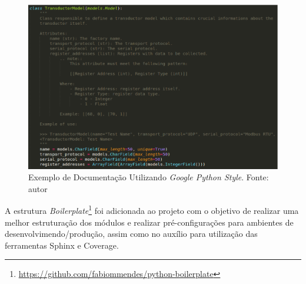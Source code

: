 \begin{figure}[!htpb]
    \centering
    \includegraphics[keepaspectratio=true,scale=0.5]{figuras/documentacao01.eps}
    \caption{Exemplo de Documentação Utilizando \textit{Google Python Style}. Fonte: autor}
    \label{documentacao01}
\end{figure}

A estrutura \textit{Boilerplate}\footnote{\url{https://github.com/fabiommendes/python-boilerplate}} foi adicionada ao projeto com o objetivo de realizar uma melhor estruturação dos módulos e realizar pré-configurações para ambientes de desenvolvimendo/produção, assim como no auxílio para utilização das ferramentas Sphinx e Coverage.

